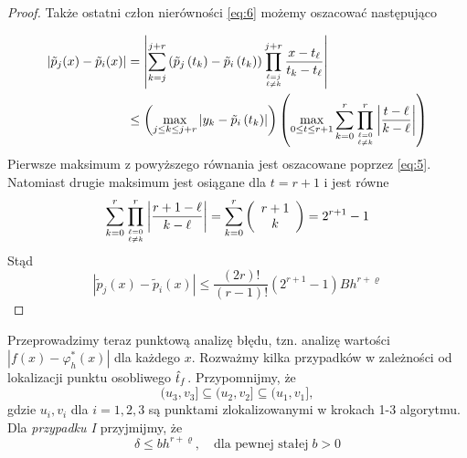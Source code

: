 \documentclass[oik, pdftex, robocza, man]{mgrwms}
\begin{document}
\begin{proof}
        Także ostatni człon nierówności \eqref{eq:6} możemy oszacować następująco

        \begin{equation*}
            \begin{aligned}
                \left|\tilde{p}_{j}(x)-\tilde{p}_{i}(x)\right| &=\left|\sum_{k=j}^{j+r}\left(\tilde{p}_{j}\left(t_{k}\right)-\tilde{p}_{i}\left(t_{k}\right)\right) \prod_{\ell=j \atop \ell \neq k}^{j+r} \frac{x-t_{\ell}}{t_{k}-t_{\ell}}\right| \\
                & \leq\left(\max _{j \leq k \leq j+r}\left|y_{k}-\tilde{p}_{i}\left(t_{k}\right)\right|\right)\left(\max _{0 \leq t \leq r+1} \sum_{k=0}^{r} \prod_{\ell=0 \atop \ell \neq k}^{r}\left|\frac{t-\ell}{k-\ell}\right|\right)
            \end{aligned}                
        \end{equation*}
        Pierwsze maksimum z powyższego równania jest oszacowane poprzez \eqref{eq:5}. Natomiast drugie maksimum jest osiągane dla $t=r+1$ i jest równe
        \begin{equation*}
            \sum_{k=0}^{r} \prod_{\ell=0 \atop \ell \neq k}^{r}\left|\frac{r+1-\ell}{k-\ell}\right|=\sum_{k=0}^{r}\left(\begin{array}{c} r+1 \\ k\end{array}\right)=2^{r+1}-1
        \end{equation*}
        Stąd
        \begin{equation*}
            \left|\tilde{p}_{j}(x)-\tilde{p}_{i}(x)\right| \leq \frac{(2 r) !}{(r-1) !}\left(2^{r+1}-1\right) B h^{r+\varrho}
        \end{equation*}
    \end{proof}

    Przeprowadzimy teraz punktową analizę błędu, tzn. analizę wartości $|f(x) - \varphi_{h}^{*}(x)|$ dla każdego $x$. Rozważmy kilka przypadków w zależności od lokalizacji punktu osobliwego $\hat{t}_{f}$. Przypomnijmy, że
    \begin{equation*}
        (u_{3}, v_{3}] \subseteq (u_{2}, v_{2}] \subseteq (u_{1}, v_{1}],
    \end{equation*}
    gdzie $u_{i}, v_{i}$ dla $i=1,2,3$ są punktami zlokalizowanymi w krokach 1-3 algorytmu. Dla \textit{przypadku I} przyjmijmy, że
    \begin{equation} \label{eq:algMP_7}
        \delta \leq bh^{r+\varrho}, \quad \text{dla pewnej stałej}\; b>0
    \end{equation}
\end{document}
